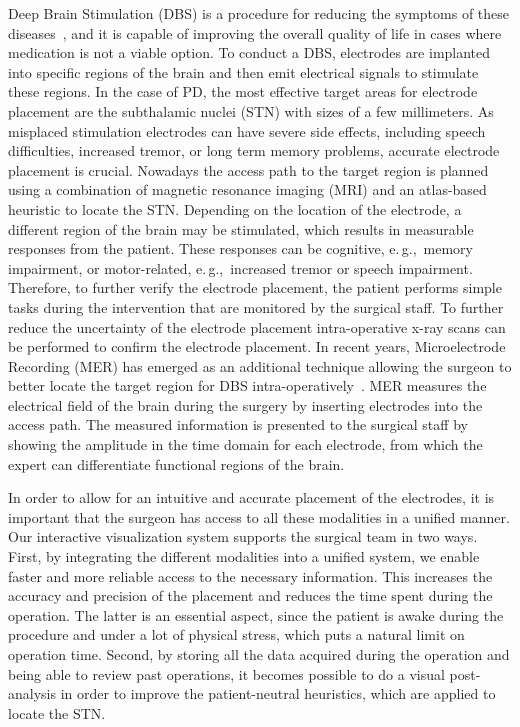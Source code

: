 \documentclass{egpubl}
\begin{document}
Deep Brain Stimulation (DBS) is a procedure for reducing the symptoms of these diseases~\cite{Benabid2009}, and it is capable of improving the overall quality of life in cases where medication is not a viable option. To conduct a DBS, electrodes are implanted into specific regions of the brain and then emit electrical signals to stimulate these regions. In the case of PD, the most effective target areas for electrode placement are the subthalamic nuclei (STN) with sizes of a few millimeters. As misplaced stimulation electrodes can have severe side effects, including speech difficulties, increased tremor, or long term memory problems, accurate electrode placement is crucial. Nowadays the access path to the target region is planned using a combination of magnetic resonance imaging (MRI) and an atlas-based heuristic to locate the STN. Depending on the location of the electrode, a different region of the brain may be stimulated, which results in measurable responses from the patient. These responses can be cognitive, e.\,g.,~memory impairment, or motor-related, e.\,g.,~increased tremor or speech impairment. Therefore, to further verify the electrode placement, the patient performs simple tasks during the intervention that are monitored by the surgical staff.  To further reduce the uncertainty of the electrode placement intra-operative x-ray scans can be performed to confirm the electrode placement. In recent years, Microelectrode Recording (MER) has emerged as an additional technique allowing the surgeon to better locate the target region for DBS intra-operatively~\cite{Lenz1988}. MER measures the electrical field of the brain during the surgery by inserting electrodes into the access path. The measured information is presented to the surgical staff by showing the amplitude in the time domain for each electrode, from which the expert can differentiate functional regions of the brain.

In order to allow for an intuitive and accurate placement of the electrodes, it is important that the surgeon has access to all these modalities in a unified manner. Our interactive visualization system supports the surgical team in two ways. First, by integrating the different modalities into a unified system, we enable faster and more reliable access to the necessary information. This increases the accuracy and precision of the placement and reduces the time spent during the operation. The latter is an essential aspect, since the patient is awake during the procedure and under a lot of physical stress, which puts a natural limit on operation time. Second, by storing all the data acquired during the operation and being able to review past operations, it becomes possible to do a visual post-analysis in order to improve the patient-neutral heuristics, which are applied to locate the STN.
\end{document}
